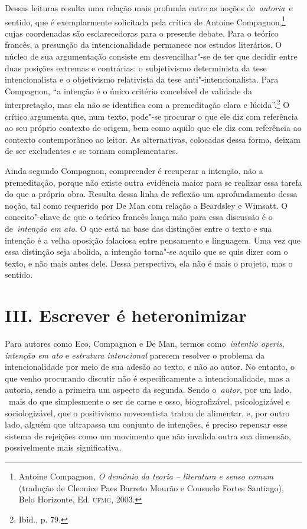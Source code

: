 Dessas leituras resulta uma relação mais profunda entre as noções
de~\emph{autoria}~e sentido, que é exemplarmente solicitada pela crítica
de Antoine Compagnon,\footnote{Antoine Compagnon, \emph{O demônio da
  teoria} \emph{-- literatura e senso comum} (tradução de Cleonice Paes
  Barreto Mourão e Consuelo Fortes Santiago), Belo Horizonte, Ed.
  \textsc{ufmg}, 2003.} cujas coordenadas são esclarecedoras para o
presente debate. Para o teórico francês, a presunção da intencionalidade
permanece nos estudos literários. O núcleo de sua argumentação consiste
em desvencilhar"-se de ter que decidir entre duas posições extremas e
contrárias: o subjetivismo determinista da tese intencionalista e o
objetivismo relativista da tese anti"-intencionalista. Para Compagnon,
``a intenção é o único critério concebível de validade da interpretação,
mas ela não se identifica com a premeditação clara e lúcida''.\footnote{Ibid.,
  p. 79.} O crítico argumenta que, num texto, pode"-se procurar o que ele
diz com referência ao seu próprio contexto de origem, bem como aquilo
que ele diz com referência ao contexto contemporâneo ao leitor. As
alternativas, colocadas dessa forma, deixam de ser excludentes e se
tornam complementares.

Ainda segundo Compagnon, compreender é recuperar a intenção, não a
premeditação, porque não existe outra evidência maior para se realizar
essa tarefa do que a própria obra. Resulta dessa linha de reflexão um
aprofundamento dessa noção, tal como requerido por De Man com relação a
Beardsley e Wimsatt. O conceito"-chave de que o teórico francês lança mão
para essa discussão é o de~\emph{intenção em ato}. O que está na base
das distinções entre o texto e sua intenção é a velha oposição falaciosa
entre pensamento e linguagem. Uma vez que essa distinção seja abolida, a
intenção torna"-se aquilo que se quis dizer com o texto, e não mais antes
dele. Dessa perspectiva, ela não é mais o projeto, mas o sentido.

\section*{III. Escrever é heteronimizar}


Para autores como Eco, Compagnon e De Man, termos como~\emph{intentio
operis}, \emph{intenção em ato} e \emph{estrutura intencional} parecem
resolver o problema da intencionalidade por meio de sua adesão ao texto,
e não ao autor. No entanto, o que venho procurando discutir não é
especificamente a intencionalidade, mas a autoria, sendo a primeira um
aspecto da segunda. Sendo o~\emph{autor}, por um lado, ~mais do que
simplesmente o ser de carne e osso, biografizável, psicologizável e
sociologizável, que o positivismo novecentista tratou de alimentar, e,
por outro lado, alguém que ultrapassa um conjunto de intenções, é
preciso repensar esse sistema de rejeições como um movimento que não
invalida outra sua dimensão, possivelmente mais significativa.

